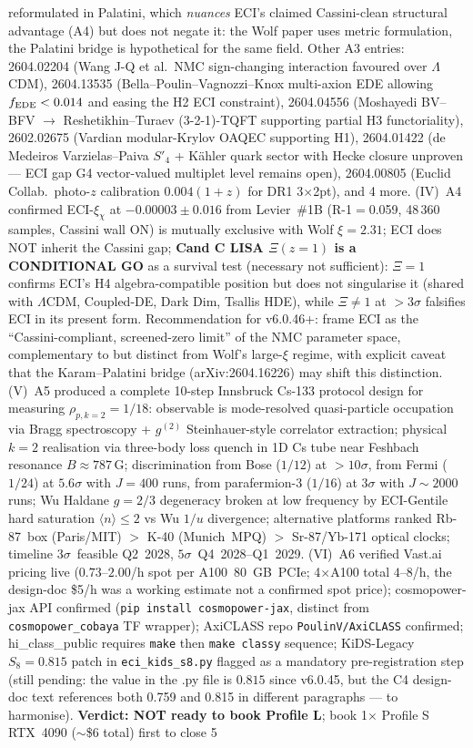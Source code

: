 \documentclass[reprint,amsmath,amssymb,aps,prd,superscriptaddress]{revtex4-2}
\providecommand{\1}{\mathbf{1}}
\begin{document}
reformulated in Palatini, which \emph{nuances} ECI's claimed Cassini-clean structural advantage (A4) but does not negate it: the Wolf paper uses metric formulation, the Palatini bridge is hypothetical for the same field. Other A3 entries: 2604.02204 (Wang J-Q et al.\ NMC sign-changing interaction favoured over $\Lambda$CDM), 2604.13535 (Bella--Poulin--Vagnozzi--Knox multi-axion EDE allowing $f_{\rm EDE}<0.014$ and easing the H2 ECI constraint), 2604.04556 (Moshayedi BV--BFV $\to$ Reshetikhin--Turaev (3-2-1)-TQFT supporting partial H3 functoriality), 2602.02675 (Vardian modular-Krylov OAQEC supporting H1), 2604.01422 (de Medeiros Varzielas--Paiva $S'_4$ + K\"{a}hler quark sector with Hecke closure unproven --- ECI gap G4 vector-valued multiplet level remains open), 2604.00805 (Euclid Collab.\ photo-$z$ calibration $0.004(1{+}z)$ for DR1 3$\times$2pt), and 4 more. (IV)~A4 confirmed ECI-$\xi_\chi$ at $-0.00003 \pm 0.016$ from Levier~\#1B (R-1$=$0.059, 48\,360 samples, Cassini wall ON) is mutually exclusive with Wolf $\xi = 2.31$; ECI does NOT inherit the Cassini gap; \textbf{Cand C LISA $\Xi(z{=}1)$ is a CONDITIONAL GO} as a survival test (necessary not sufficient): $\Xi{=}1$ confirms ECI's H4 algebra-compatible position but does not singularise it (shared with $\Lambda$CDM, Coupled-DE, Dark Dim, Tsallis HDE), while $\Xi{\neq}1$ at $>3\sigma$ falsifies ECI in its present form. Recommendation for v6.0.46+: frame ECI as the ``Cassini-compliant, screened-zero limit'' of the NMC parameter space, complementary to but distinct from Wolf's large-$\xi$ regime, with explicit caveat that the Karam--Palatini bridge (arXiv:2604.16226) may shift this distinction. (V)~A5 produced a complete 10-step Innsbruck Cs-133 protocol design for measuring $\rho_{p,k=2}{=}1/18$: observable is mode-resolved quasi-particle occupation via Bragg spectroscopy + $g^{(2)}$ Steinhauer-style correlator extraction; physical $k{=}2$ realisation via three-body loss quench in 1D Cs tube near Feshbach resonance $B \approx 787$\,G; discrimination from Bose ($1/12$) at $>10\sigma$, from Fermi ($1/24$) at $5.6\sigma$ with $J{=}400$ runs, from parafermion-3 ($1/16$) at $3\sigma$ with $J{\sim}2000$ runs; Wu Haldane $g{=}2/3$ degeneracy broken at low frequency by ECI-Gentile hard saturation $\langle n\rangle\leq 2$ vs Wu $1/u$ divergence; alternative platforms ranked Rb-87~box (Paris/MIT) $>$ K-40 (Munich~MPQ) $>$ Sr-87/Yb-171 optical clocks; timeline $3\sigma$~feasible Q2~2028, $5\sigma$~Q4~2028--Q1~2029. (VI)~A6 verified Vast.ai pricing live ($0.73$--$2.00$/h spot per A100~80~GB~PCIe; 4$\times$A100 total $4$--$8$/h, the design-doc \$5/h was a working estimate not a confirmed spot price); cosmopower-jax API confirmed (\texttt{pip install cosmopower-jax}, distinct from \texttt{cosmopower\_cobaya} TF wrapper); AxiCLASS repo \texttt{PoulinV/AxiCLASS} confirmed; hi\_class\_public requires \texttt{make} then \texttt{make classy} sequence; KiDS-Legacy $S_8{=}0.815$ patch in \texttt{eci\_kids\_s8.py} flagged as a mandatory pre-registration step (still pending: the value in the .py file is $0.815$ since v6.0.45, but the C4 design-doc text references both 0.759 and 0.815 in different paragraphs --- to harmonise). \textbf{Verdict: NOT ready to book Profile L}; book 1$\times$ Profile S RTX~4090 ($\sim$\$6 total) first to close 5 
\end{document}

